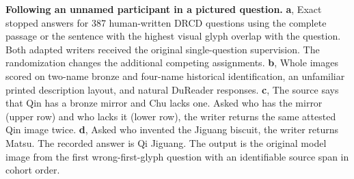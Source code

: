\textbf{Following an unnamed participant in a pictured question.}
\textbf{a}, Exact stopped answers for 387 human-written DRCD questions using the complete passage or the sentence with the highest visual glyph overlap with the question. Both adapted writers received the original single-question supervision. The randomization changes the additional competing assignments.
\textbf{b}, Whole images scored on two-name bronze and four-name historical identification, an unfamiliar printed description layout, and natural DuReader responses.
\textbf{c}, The source says that Qin has a bronze mirror and Chu lacks one. Asked who has the mirror (upper row) and who lacks it (lower row), the writer returns the same attested Qin image twice.
\textbf{d}, Asked who invented the Jiguang biscuit, the writer returns Matsu. The recorded answer is Qi Jiguang. The output is the original model image from the first wrong-first-glyph question with an identifiable source span in cohort order.
